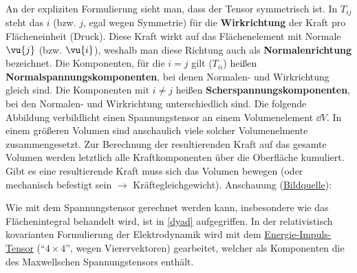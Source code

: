  An der expliziten Formulierung sieht man, dass der Tensor symmetrisch ist. In \(T_{ij}\) steht das $i$ (bzw. $j$, egal wegen Symmetrie) für die \textbf{Wirkrichtung} der Kraft pro Flächeneinheit (Druck). Diese Kraft wirkt auf das Flächenelement mit Normale \(\vu{j}\) (bzw. $\vu{i}$), weshalb man diese Richtung auch als \textbf{Normalenrichtung} bezeichnet.  Die Komponenten, für die \(i=j\) gilt (\(T_{ii}\)) heißen \textbf{Normalspannungskomponenten}, bei denen Normalen- und Wirkrichtung gleich sind. Die Komponenten mit \( i \ne j \) heißen \textbf{Scherspannungskomponenten}, bei den Normalen- und Wirkrichtung unterschiedlich sind. Die folgende Abbildung verbildlicht einen Spannungstensor an einem Volumenelement $\dd V$. In einem größeren Volumen sind anschaulich viele solcher Volumenelmente zusammengesetzt. Zur Berechnung der resultierenden Kraft auf das gesamte Volumen werden letztlich alle Kraftkomponenten über die Oberfläche kumuliert. Gibt es eine resultierende Kraft muss sich das Volumen bewegen (oder mechanisch befestigt sein $\to$ Kräftegleichgewicht). Anschauung (\href{https://tex.stackexchange.com/questions/553898/how-to-draw-a-cube-with-coordinate-systems-in-tikz}{Bildquelle}):
 \begin{center}
 	\resizebox{!}{.3\textwidth}{}
 \end{center}
Wie mit dem Spannungstensor gerechnet werden kann, insbesondere wie das Flächenintegral behandelt wird, ist in \ref{dyad} aufgegriffen. In der relativistisch kovarianten Formulierung der Elektrodynamik wird mit dem \href{https://en.wikipedia.org/wiki/Covariant_formulation_of_classical_electromagnetism#Electromagnetic_stress%E2%80%93energy_tensor}{Energie-Impuls-Tensor} (\enquote{$4\times 4$}, wegen Vierervektoren) gearbeitet, welcher als Komponenten die des Maxwellschen Spannungstensors enthält.
